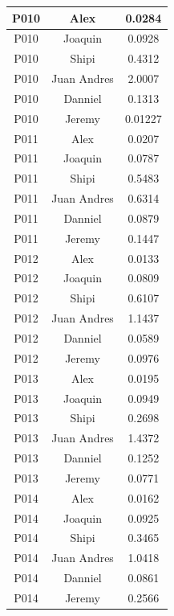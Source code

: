 \begin{longtable}{|c|c|c|}
    P010 & Alex        & 0.0284 \\ \hline
    P010 & Joaquin     & 0.0928 \\ \hline
    P010 & Shipi       & 0.4312 \\ \hline
    P010 & Juan Andres & 2.0007 \\ \hline
    P010 & Danniel     & 0.1313 \\ \hline
    P010 & Jeremy      & 0.01227 \\ \hline

    P011 & Alex        & 0.0207 \\ \hline
    P011 & Joaquin     & 0.0787 \\ \hline
    P011 & Shipi       & 0.5483 \\ \hline
    P011 & Juan Andres & 0.6314 \\ \hline
    P011 & Danniel     & 0.0879 \\ \hline
    P011 & Jeremy      & 0.1447 \\ \hline

    P012 & Alex        & 0.0133 \\ \hline
    P012 & Joaquin     & 0.0809 \\ \hline
    P012 & Shipi       & 0.6107 \\ \hline
    P012 & Juan Andres & 1.1437 \\ \hline
    P012 & Danniel     & 0.0589 \\ \hline
    P012 & Jeremy      & 0.0976 \\ \hline

    P013 & Alex        & 0.0195 \\ \hline
    P013 & Joaquin     & 0.0949 \\ \hline
    P013 & Shipi       & 0.2698 \\ \hline
    P013 & Juan Andres & 1.4372 \\ \hline
    P013 & Danniel     & 0.1252 \\ \hline
    P013 & Jeremy      & 0.0771 \\ \hline

    P014 & Alex        & 0.0162 \\ \hline
    P014 & Joaquin     & 0.0925 \\ \hline
    P014 & Shipi       & 0.3465 \\ \hline
    P014 & Juan Andres & 1.0418 \\ \hline
    P014 & Danniel     & 0.0861 \\ \hline
    P014 & Jeremy      & 0.2566 \\ \hline


\end{longtable}
